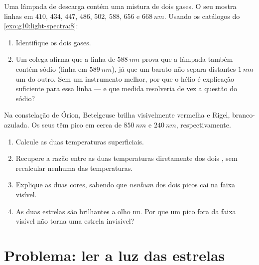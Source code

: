 \begin{exercise}[$\star\star\star$]\label{exo:g10:light-spectra:14}
Uma lâmpada de descarga contém uma mistura de dois gases. O seu 
mostra linhas em $410$, $434$, $447$, $486$, $502$, $588$, $656$ e
$\qty{668}{nm}$. Usando os catálogos do \cref{exo:g10:light-spectra:8}:
\begin{enumerate}
  \item Identifique os dois gases.
  \item Um colega afirma que a linha de $\qty{588}{nm}$ prova que a lâmpada
        também contém sódio (linha em $\qty{589}{nm}$), já que um
         barato não separa  distantes
        $\qty{1}{nm}$ um do outro. Sem um instrumento melhor, por que o
        hélio é explicação suficiente para essa linha --- e que medida
        resolveria de vez a questão do sódio?
\end{enumerate}
\end{exercise}

\begin{exercise}[$\star\star\star$]\label{exo:g10:light-spectra:15}
Na constelação de Órion, Betelgeuse brilha visivelmente vermelha e Rigel,
branco-azulada. Os seus  têm pico em cerca de
$\qty{850}{nm}$ e $\qty{240}{nm}$, respectivamente.
\begin{enumerate}
  \item Calcule as duas temperaturas superficiais.
  \item Recupere a razão entre as duas temperaturas diretamente dos dois
        , sem recalcular nenhuma das temperaturas.
  \item Explique as duas cores, sabendo que \emph{nenhum} dos dois picos cai
        na faixa visível.
  \item As duas estrelas são brilhantes a olho nu. Por que um pico fora da
        faixa visível não torna uma estrela invisível?
\end{enumerate}
\end{exercise}

\section{Problema: ler a luz das estrelas}

